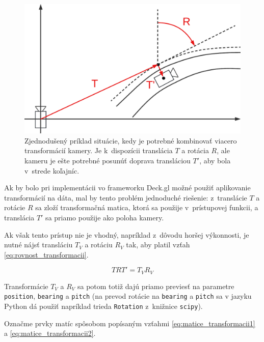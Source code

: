 \begin{figure}[h]
    \centering
    \includegraphics[width=0.8\linewidth]{text_prace/obrazky-figures/tri_transformacie.pdf}
    \caption[Kombinácia viacerých transformácií kamery.]{Zjednodušený príklad situácie, kedy je potrebné kombinovať viacero transformácií kamery. Je k~dispozícii translácia $T$ a rotácia $R$, ale kameru je ešte potrebné posunúť doprava transláciou $T'$, aby bola v~strede koľajníc.}
    \label{fig:transformacie_kamery}
\end{figure}

Ak by bolo pri implementácii vo frameworku Deck.gl možné použiť aplikovanie transformácií na dáta, mal by tento problém jednoduché riešenie: z~translácie $T$ a rotácie $R$ sa zloží transformačná matica, ktorá sa použije v~prístupovej funkcii, a translácia $T'$ sa priamo použije ako poloha kamery.

Ak však tento prístup nie je vhodný, napríklad z~dôvodu horšej výkonnosti, je nutné nájsť transláciu $T_V$ a rotáciu $R_V$ tak, aby platil vzťah \ref{eq:rovnost_transformacii}.

\begin{equation}
T R T' = T_V R_V
\label{eq:rovnost_transformacii}
\end{equation}

Transformácie $T_V$ a $R_V$ sa potom totiž dajú priamo previesť na parametre \texttt{position}, \texttt{bearing} a \texttt{pitch} (na prevod rotácie na \texttt{bearing} a \texttt{pitch} sa v jazyku Python dá použiť napríklad trieda \texttt{Rotation} z~knižnice \texttt{scipy}).

Označme prvky matíc spôsobom popísaným vzťahmi \ref{eq:matice_transformacii1} a \ref{eq:matice_transformacii2}.

